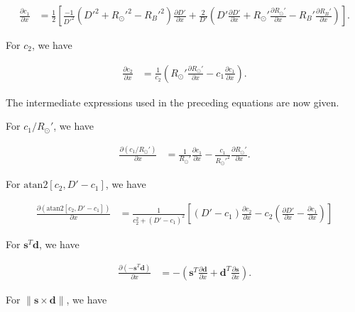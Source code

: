 \begin{align}
\frac{\partial c_1}{\partial x} &= \frac{1}{2} \left[ \frac{-1}{D'^2} \left( D'^2 + R_{\odot}'^2 - R_B'^2 \right) \frac{\partial D'}{\partial x} + \frac{2}{D'} \left( D' \frac{\partial D'}{\partial x} + R_{\odot}' \frac{\partial R_{\odot}'}{\partial x} - R_B' \frac{\partial R_B'}{\partial x} \right) \right].
\end{align}

For $c_2$, we have

\begin{align}
\frac{\partial c_2}{\partial x} &= \frac{1}{c_2} \left( R_{\odot}' \frac{\partial R_{\odot}'}{\partial x} - c_1 \frac{\partial c_1}{\partial x} \right).
\end{align}

The intermediate expressions used in the preceding equations are now given.

For $c_1 / R_{\odot}'$, we have

\begin{align}
\frac{\partial \left( c_1 / R_{\odot}' \right)}{\partial x} &= \frac{1}{R_{\odot}'} \frac{\partial c_1}{\partial x} - \frac{c_1}{R_{\odot}'^2} \frac{\partial R_{\odot}'}{\partial x}.
\end{align}

For $\mathrm{atan2} \left[ c_2, D' - c_1 \right]$, we have

\begin{align}
	\frac{\partial \left( \mathrm{atan2} \left[ c_2, D' - c_1 \right] \right)}{\partial x} &= \frac{1}{c_2^2 + \left( D' - c_1 \right)^2} \left[ \left( D' - c_1 \right) \frac{\partial c_2}{\partial x} - c_2 \left( \frac{\partial D'}{\partial x} - \frac{\partial c_1}{\partial x} \right) \right]
\end{align}

For $\mathbf{s}^T \mathbf{d}$, we have

\begin{align}
	\frac{\partial \left( - \mathbf{s}^T \mathbf{d} \right)}{\partial x} &= - \left( \mathbf{s}^T  \frac{\partial \mathbf{d}}{\partial x} + \mathbf{d}^T \frac{\partial \mathbf{s}}{\partial x} \right).
\end{align}

For $\| \mathbf{s} \times \mathbf{d} \|$, we have

